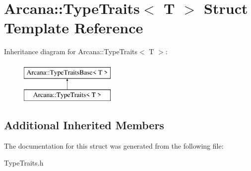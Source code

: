 \hypertarget{struct_arcana_1_1_type_traits}{}\section{Arcana\+:\+:Type\+Traits$<$ T $>$ Struct Template Reference}
\label{struct_arcana_1_1_type_traits}
Inheritance diagram for Arcana\+:\+:Type\+Traits$<$ T $>$\+:\begin{figure}[H]
\begin{center}
\leavevmode
\includegraphics[height=2.000000cm]{struct_arcana_1_1_type_traits}
\end{center}
\end{figure}
\subsection*{Additional Inherited Members}


The documentation for this struct was generated from the following file\+:\begin{DoxyCompactItemize}
\item 
Type\+Traits.\+h\end{DoxyCompactItemize}
